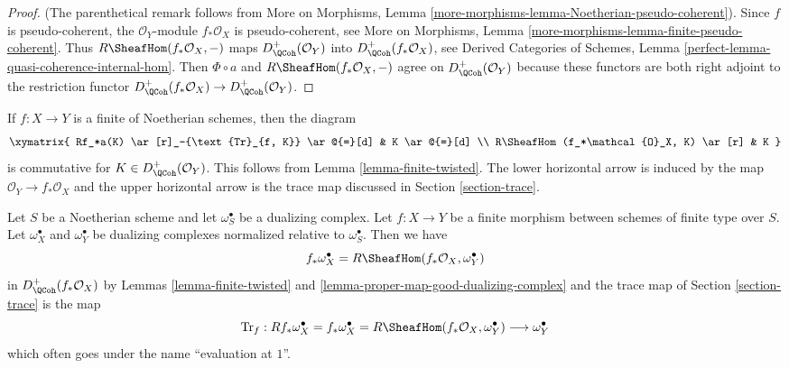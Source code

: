 \begin{proof}
(The parenthetical remark follows from More on Morphisms, Lemma
\ref{more-morphisms-lemma-Noetherian-pseudo-coherent}).
Since $f$ is pseudo-coherent, the $\mathcal{O}_Y$-module $f_*\mathcal{O}_X$ is
pseudo-coherent, see More on Morphisms, Lemma
\ref{more-morphisms-lemma-finite-pseudo-coherent}.
Thus $R\SheafHom(f_*\mathcal{O}_X, -)$ maps
$D_\QCoh^+(\mathcal{O}_Y)$ into
$D_\QCoh^+(f_*\mathcal{O}_X)$, see
Derived Categories of Schemes, Lemma
\ref{perfect-lemma-quasi-coherence-internal-hom}.
Then $\Phi \circ a$ and $R\SheafHom(f_*\mathcal{O}_X, -)$
agree on $D_\QCoh^+(\mathcal{O}_Y)$ because these functors are
both right adjoint to the restriction functor
$D_\QCoh^+(f_*\mathcal{O}_X) \to D_\QCoh^+(\mathcal{O}_Y)$.
\end{proof}

\begin{remark}
\label{remark-trace-map-finite}
If $f : X \to Y$ is a finite of Noetherian schemes, then the diagram
$$
\xymatrix{
Rf_*a(K) \ar[r]_-{\text{Tr}_{f, K}} \ar@{=}[d] & K \ar@{=}[d] \\
R\SheafHom(f_*\mathcal{O}_X, K) \ar[r] & K
}
$$
is commutative for $K \in D_\QCoh^+(\mathcal{O}_Y)$. This follows
from Lemma \ref{lemma-finite-twisted}. The lower horizontal
arrow is induced by the map $\mathcal{O}_Y \to f_*\mathcal{O}_X$ and the
upper horizontal arrow is the trace map discussed in
Section \ref{section-trace}.
\end{remark}

\begin{remark}
\label{remark-dualizing-finite}
Let $S$ be a Noetherian scheme and let $\omega_S^\bullet$ be a dualizing
complex. Let $f : X \to Y$ be a finite morphism between schemes of finite
type over $S$. Let $\omega_X^\bullet$ and $\omega_Y^\bullet$ be
dualizing complexes normalized relative to $\omega_S^\bullet$.
Then we have
$$
f_*\omega_X^\bullet = R\SheafHom(f_*\mathcal{O}_X, \omega_Y^\bullet)
$$
in $D_\QCoh^+(f_*\mathcal{O}_X)$ by Lemmas \ref{lemma-finite-twisted} and
\ref{lemma-proper-map-good-dualizing-complex}
and the trace map of Section \ref{section-trace} is the map
$$
\text{Tr}_f : Rf_*\omega_X^\bullet = f_*\omega_X^\bullet =
R\SheafHom(f_*\mathcal{O}_X, \omega_Y^\bullet) \longrightarrow
\omega_Y^\bullet
$$
which often goes under the name ``evaluation at $1$''.
\end{remark}











